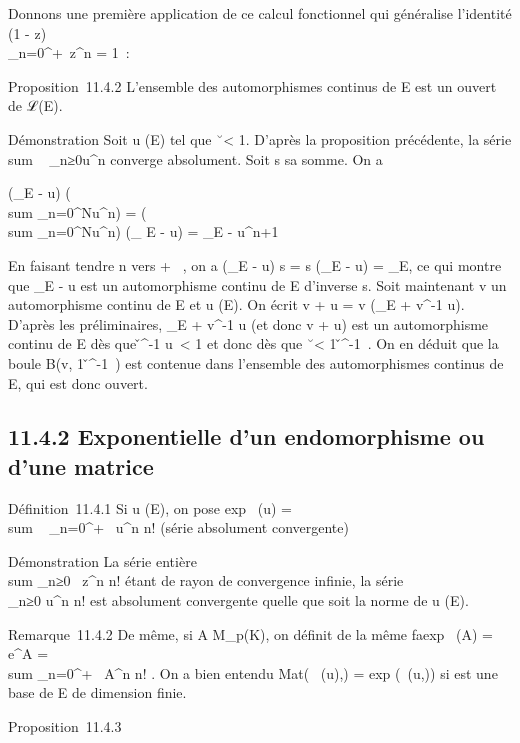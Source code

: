 \documentclass[]{article}
\begin{document}
Donnons une première application de ce calcul fonctionnel qui généralise
l'identité (1 - z)\\\sum
 _n=0^+\infty~z^n = 1~:

Proposition~11.4.2 L'ensemble des automorphismes continus de E est un
ouvert de ℒ(E).

Démonstration Soit u (E) tel que
\u\ < 1.
D'après la proposition précédente, la série
\\sum ~
_n≥0u^n converge absolument. Soit s sa somme. On a

(\mathrmId_E - u) \cdot\left
(\\sum
_n=0^Nu^n\right ) =
\left (\\sum
_n=0^Nu^n\right ) \cdot
(\mathrmId_ E - u) =
\mathrmId_E - u^n+1

En faisant tendre n vers + \infty~, on a
(\mathrmId_E - u) \cdot s = s \cdot
(\mathrmId_E - u) =
\mathrmId_E, ce qui montre que
\mathrmId_E - u est un automorphisme continu
de E d'inverse s. Soit maintenant v un automorphisme continu de E et u
(E). On écrit v + u = v \cdot (\mathrmId_E +
v^-1 \cdot u). D'après les préliminaires,
\mathrmId_E + v^-1 \cdot u (et donc v
+ u) est un automorphisme continu de E dès que
\v^-1 \cdot u\
< 1 et donc dès que
\u\ < 1
\over
\v^-1\ .
On en déduit que la boule B(v, 1 \over
\v^-1\ )
est contenue dans l'ensemble des automorphismes continus de E, qui est
donc ouvert.

\subsection{11.4.2 Exponentielle d'un endomorphisme ou d'une matrice}

Définition~11.4.1 Si u (E), on pose exp~ (u)
= \\sum ~
_n=0^+\infty~ u^n \over n! (série
absolument convergente)

Démonstration La série entière
\\sum  _n≥0~
z^n \over n! étant de rayon de convergence
infinie, la série \\\sum
 _n≥0 u^n \over n! est
absolument convergente quelle que soit la norme de u (E).

Remarque~11.4.2 De même, si A \in M_p(K), on définit de la même
fa\ccon exp~ (A) =
e^A =\ \\sum
 _n=0^+\infty~ A^n \over n! .
On a bien entendu
Mat(\exp~ (u),)
= exp (\Mat~(u,\mathcal{E})) si
\mathcal{E} est une base de E de dimension finie.

Proposition~11.4.3
\end{document}
